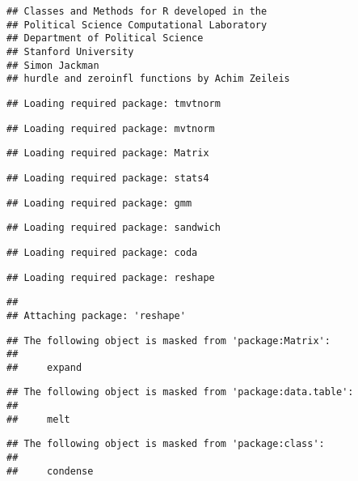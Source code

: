 \documentclass[11pt,]{article}
\begin{document}
\begin{verbatim}
## Classes and Methods for R developed in the
## Political Science Computational Laboratory
## Department of Political Science
## Stanford University
## Simon Jackman
## hurdle and zeroinfl functions by Achim Zeileis
\end{verbatim}

\begin{verbatim}
## Loading required package: tmvtnorm
\end{verbatim}

\begin{verbatim}
## Loading required package: mvtnorm
\end{verbatim}

\begin{verbatim}
## Loading required package: Matrix
\end{verbatim}

\begin{verbatim}
## Loading required package: stats4
\end{verbatim}

\begin{verbatim}
## Loading required package: gmm
\end{verbatim}

\begin{verbatim}
## Loading required package: sandwich
\end{verbatim}

\begin{verbatim}
## Loading required package: coda
\end{verbatim}

\begin{verbatim}
## Loading required package: reshape
\end{verbatim}

\begin{verbatim}
## 
## Attaching package: 'reshape'
\end{verbatim}

\begin{verbatim}
## The following object is masked from 'package:Matrix':
## 
##     expand
\end{verbatim}

\begin{verbatim}
## The following object is masked from 'package:data.table':
## 
##     melt
\end{verbatim}

\begin{verbatim}
## The following object is masked from 'package:class':
## 
##     condense
\end{verbatim}
\end{document}

